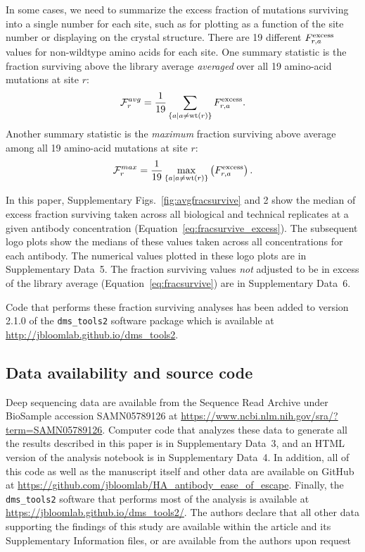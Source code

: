 \documentclass[11pt]{article}
\begin{document}
In some cases, we need to summarize the excess fraction of mutations surviving into a single number for each site, such as for plotting as a function of the site number or displaying on the crystal structure.
There are 19 different $F_{r,a}^{\rm{excess}}$ values for non-wildtype amino acids for each site. 
One summary statistic is the fraction surviving above the library average \emph{averaged} over all 19 amino-acid mutations at site $r$:
\begin{equation}
\label{eq:avgfracsurvive}
\mathcal{F}_r^{avg} = \frac{1}{19} \sum\limits_{\left\{a \mid a \ne \operatorname{wt}\left(r\right)\right\}} F_{r,a}^{\rm{excess}}.
\end{equation}
Another summary statistic is the \emph{maximum} fraction surviving above average among all 19 amino-acid mutations at site $r$:
\begin{equation}
\label{eq:maxfracsurvive}
\mathcal{F}_r^{max} = \frac{1}{19} \max\limits_{\left\{a \mid a \ne \operatorname{wt}\left(r\right)\right\}}\left( F_{r,a}^{\rm{excess}} \right).
\end{equation}

In this paper, Supplementary Figs.~\ref{fig:avgfracsurvive} and 2 show the median of excess fraction surviving taken across all biological and technical replicates at a given antibody concentration (Equation~\ref{eq:fracsurvive_excess}).
The subsequent logo plots show the medians of these values taken across all concentrations for each antibody.
The numerical values plotted in these logo plots are in Supplementary Data~5.
The fraction surviving values \emph{not} adjusted to be in excess of the library average (Equation~\ref{eq:fracsurvive}) are in Supplementary Data~6.


Code that performs these fraction surviving analyses has been added to version 2.1.0 of the \texttt{dms\_tools2} software package\cite{bloom2015software} which is available at \url{http://jbloomlab.github.io/dms_tools2}.

\subsection*{Data availability and source code}
Deep sequencing data are available from the Sequence Read Archive under BioSample accession SAMN05789126 at \url{https://www.ncbi.nlm.nih.gov/sra/?term=SAMN05789126}.
Computer code that analyzes these data to generate all the results described in this paper is in Supplementary Data~3, and an HTML version of the analysis notebook is in Supplementary Data~4.
In addition, all of this code as well as the manuscript itself and other data are available on GitHub at \url{https://github.com/jbloomlab/HA_antibody_ease_of_escape}.
Finally, the \texttt{dms\_tools2} software\cite{bloom2015software} that performs most of the analysis is available at \url{https://jbloomlab.github.io/dms_tools2/}.
The authors declare that all other data supporting the findings of this study are available within the article and its Supplementary Information files, or are available from the authors upon request
\end{document}
